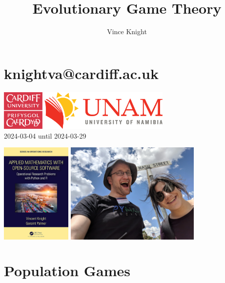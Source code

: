 \documentclass{beamer}              %
\title{Evolutionary Game Theory}
\author{Vince Knight}
\date{}
\begin{document}
\frame{
    \titlepage
}

\section{knightva@cardiff.ac.uk}

\begin{frame}
    \centering

    \includegraphics[height=2cm]{static/CUident_CMYK.png}
    \hfill
    \includegraphics[height=2cm]{static/Logo_UNAM_Namibia.png}\\
    \tiny{2024-03-04 until 2024-03-29}

\end{frame}

\begin{frame}
    \centering

    \includegraphics[height=5cm]{static/book.jpg}
    \hfill
    \includegraphics[height=5cm]{static/nash-street.jpg}
\end{frame}

\section{Population Games}
\end{document}
